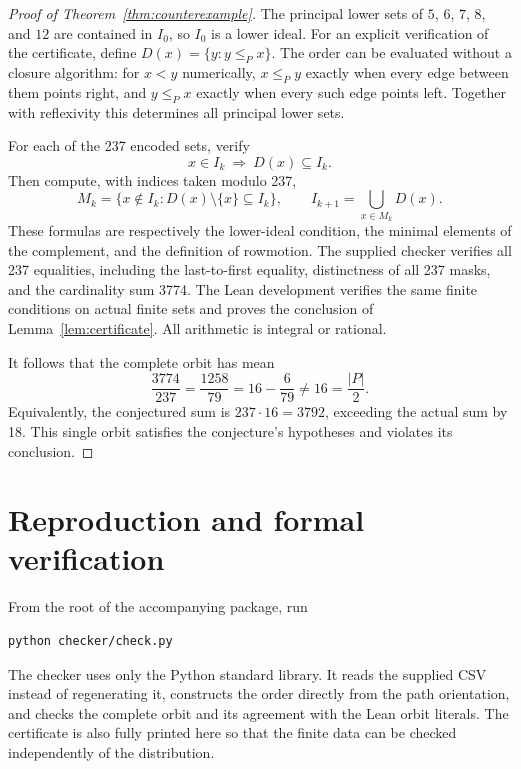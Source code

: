 \documentclass[11pt]{article}
\begin{document}
\begin{proof}[Proof of Theorem~\ref{thm:counterexample}]
The principal lower sets of $5$, $6$, $7$, $8$, and $12$ are contained
in $I_0$, so $I_0$ is a lower ideal. For an explicit verification of the
certificate, define $D(x)=\{y:y\le_P x\}$. The order can be evaluated
without a closure algorithm: for $x<y$ numerically, $x\le_P y$ exactly
when every edge between them points right, and $y\le_P x$ exactly when
every such edge points left. Together with reflexivity this determines
all principal lower sets.

For each of the 237 encoded sets, verify
\[
 x\in I_k\ \Longrightarrow\ D(x)\subseteq I_k.
\]
Then compute, with indices taken modulo 237,
\[
 M_k=\{x\notin I_k:D(x)\setminus\{x\}\subseteq I_k\},
 \qquad I_{k+1}=\bigcup_{x\in M_k}D(x).
\]
These formulas are respectively the lower-ideal condition, the minimal
elements of the complement, and the definition of rowmotion. The
supplied checker verifies all 237 equalities, including the last-to-first
equality, distinctness of all 237 masks, and the cardinality sum 3774.
The Lean development verifies the same finite conditions on actual
finite sets and proves the conclusion of Lemma~\ref{lem:certificate}.
All arithmetic is integral or rational.

It follows that the complete orbit has mean
\[
 \frac{3774}{237}=\frac{1258}{79}=16-\frac6{79}\ne16=\frac{|P|}{2}.
\]
Equivalently, the conjectured sum is $237\cdot16=3792$, exceeding the
actual sum by 18. This single orbit satisfies the conjecture's hypotheses
and violates its conclusion.
\end{proof}

\section{Reproduction and formal verification}
From the root of the accompanying package, run
\begin{verbatim}
python checker/check.py
\end{verbatim}
The checker uses only the Python standard library. It reads the supplied
CSV instead of regenerating it, constructs the order directly from the
path orientation, and checks the complete orbit and its agreement with
the Lean orbit literals. The certificate is also fully printed here so
that the finite data can be checked independently of the distribution.
\end{document}

